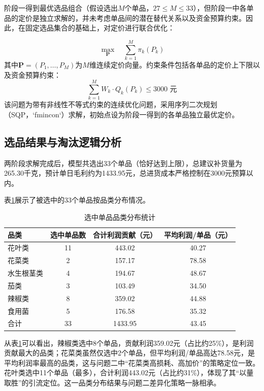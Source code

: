 \documentclass[withoutpreface]{cumcmthesis}
\begin{document}
阶段一得到最优选品组合（假设选出$M$个单品，$27 \leq M \leq 33$），但阶段一中各单品的定价是独立求解的，并未考虑单品间的潜在替代关系以及资金预算约束。因此，在固定选品集合的基础上，对定价进行联合优化：

\begin{equation}
\max_{\mathbf{P}} \quad \sum_{k=1}^{M} \pi_k(P_k)
\end{equation}
其中$\mathbf{P} = (P_1,\dots,P_M)$为$M$维连续定价向量。约束条件包括各单品的定价上下限以及资金预算约束：
\begin{equation}
\sum_{k=1}^{M} W_k \cdot Q_k(P_k) \leq 3000 \text{ 元}
\end{equation}
该问题为带有非线性不等式约束的连续优化问题，采用序列二次规划（SQP，`fmincon`）求解，初始点设为阶段一得到的各单品独立最优定价。

\subsection{选品结果与淘汰逻辑分析}

两阶段求解完成后，模型共选出33个单品（恰好达到上限），总建议补货量为265.30千克，预计单日毛利约为1433.95元，总进货成本严格控制在3000元预算以内。

表\ref{tab:category_dist}展示了被选中的33个单品按品类分布情况。

\begin{table}[H]
\centering
\caption{选中单品品类分布统计}
\label{tab:category_dist}
\begin{tabular}{lccc}
\toprule
品类 & 选中单品数 & 合计利润贡献（元） & 平均利润/单品（元） \\
\midrule
花叶类 & 11 & 443.02 & 40.27 \\
花菜类 & 2 & 157.17 & 78.58 \\
水生根茎类 & 4 & 194.67 & 48.67 \\
茄类 & 3 & 103.49 & 34.50 \\
辣椒类 & 8 & 359.02 & 44.88 \\
食用菌 & 5 & 176.58 & 35.32 \\
\hline
合计 & 33 & 1433.95 & 43.45 \\
\bottomrule
\end{tabular}
\end{table}

从表\ref{tab:category_dist}可以看出，辣椒类选中8个单品，贡献利润359.02元（占比约25\%），是利润贡献最大的品类；花菜类虽然仅选中2个单品，但平均利润/单品高达78.58元，是平均利润率最高的品类，这与问题二中“花菜类高损耗、高加价”的策略定位一致。花叶类选中11个单品（最多），合计利润443.02元（占比约31\%），体现了其“以量取胜”的引流定位。这一品类分布结果与问题二差异化策略一脉相承。
\end{document}
